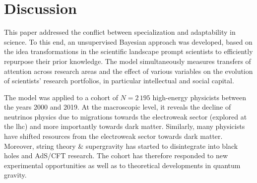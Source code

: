 \documentclass{article}
\begin{document}

\section{Discussion}

This paper addressed the conflict between specialization and adaptability in science. To this end, an unsupervised Bayesian approach was developed, based on the idea transformations in the scientific landscape prompt scientists to efficiently repurpose their prior knowledge. The model simultaneously measures transfers of attention across research areas and the effect of various variables on the evolution of scientists' research portfolios, in particular intellectual and social capital.






The model was applied to a cohort of $N=2\,195$ high-energy physicists between the years 2000 and 2019. At the macroscopic level, it reveals the decline of neutrinos physics due to migrations towards the electroweak sector (explored at the \gls{lhc}) and more importantly towards dark matter. Similarly, many physicists have shifted resources from the electroweak sector towards dark matter. Moreover, string theory \& supergravity has started to disintegrate into black holes and AdS/CFT research. The cohort has therefore responded to new experimental opportunities as well as to theoretical developments in quantum gravity. 
\end{document}
